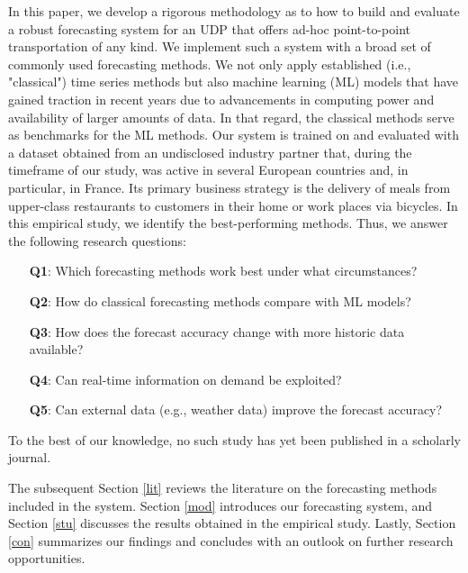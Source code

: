 In this paper, we develop a rigorous methodology as to how to build and
    evaluate a robust forecasting system for an UDP
    that offers ad-hoc point-to-point transportation of any kind.
We implement such a system with a broad set of commonly used forecasting
    methods.
We not only apply established (i.e., "classical") time series methods but also
    machine learning (ML) models that have gained traction in recent
    years due to advancements in computing power and availability of larger
    amounts of data.
In that regard, the classical methods serve as benchmarks for the ML methods.
Our system is trained on and evaluated with a dataset obtained from an
    undisclosed industry partner that, during the timeframe of our study, was
    active in several European countries and, in particular, in France.
Its primary business strategy is the delivery of meals from upper-class
    restaurants to customers in their home or work places via bicycles.
In this empirical study, we identify the best-performing methods.
Thus, we answer the following research questions:
\begin{enumerate}
\item[\textbf{Q1}:]
    Which forecasting methods work best under what circumstances?
\item[\textbf{Q2}:]
    How do classical forecasting methods compare with ML models?
\item[\textbf{Q3}:]
    How does the forecast accuracy change with more historic data available?
\item[\textbf{Q4}:]
    Can real-time information on demand be exploited?
\item[\textbf{Q5}:]
    Can external data (e.g., weather data) improve the forecast accuracy?
\end{enumerate}
To the best of our knowledge, no such study has yet been published in a
    scholarly journal.

The subsequent Section \ref{lit} reviews the literature on the forecasting
    methods included in the system.
Section \ref{mod} introduces our forecasting system, and Section \ref{stu}
    discusses the results obtained in the empirical study.
Lastly, Section \ref{con} summarizes our findings and concludes
    with an outlook on further research opportunities.
